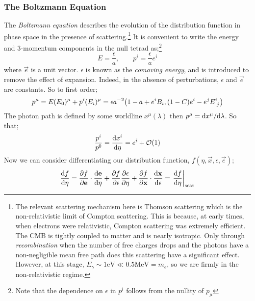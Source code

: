 \subsubsection{The Boltzmann Equation}
The \emph{Boltzmann equation} describes the evolution of the distribution function in phase space in the presence of scattering.\footnote{The relevant scattering mechanism here is Thomson scattering which is the non-relativistic limit of Compton scattering. This is because, at early times, when electrons were relativistic, Compton scattering was extremely efficient. The CMB is tightly coupled to matter and is nearly isotropic. Only through \emph{recombination} when the number of free charges drops and the photons have a non-negligible mean free path does this scattering have a significant effect. However, at this stage, $E_{\gamma} \sim 1 \text{eV} \ll 0.5\text{MeV} = m_e$, so we are firmly in the non-relativistic regime.}
It is convenient to write the energy and $3$-momentum components in the null tetrad as;\footnote{Note that the dependence on $\epsilon$ in $p^i$ follows from the nullity of $p_{\mu}$}
\begin{equation*}
E = \frac{\epsilon}{a}, \qquad p^i = \frac{\epsilon}{a}e^{i}
\end{equation*}
where $\vec e$ is a unit vector. $\epsilon$ is known as the \emph{comoving energy}, and is introduced to remove the effect of expansion. Indeed, in the absence of perturbations, $\epsilon$ and $\vec e$ are constants. So to first order;
\begin{equation}
p^{\mu} = E(E_0)^{\mu} + p^{i}(E_i)^{\mu} = \epsilon a^{-2}\left(1 - a + e^{i}B_i, (1-C)e^{i} - e^{j}E\indices{^{i}_{j}}\right)
\end{equation}
The photon path is defined by some worldline $x^{\mu}(\lambda)$ then $p^{\mu} = \text{d} x^\mu / \text{d} \lambda$. So that;
\begin{equation}
\frac{p^{i}}{p^{0}} = \frac{\text{d} x^i}{\text{d} \eta} = e^{i} + \mathcal{O}(1)
\end{equation}
Now we can consider differentiating our distribution function, $f(\eta, \vec x, \epsilon, \vec e)$;
\begin{equation}
\frac{\ud f}{\ud \eta} = \frac{\del f}{\del \vec e}\cdot\frac{\ud \vec e}{\ud \eta} + \frac{\del f}{\del \epsilon} \frac{\del \epsilon}{\del \eta} + \frac{\del f}{\del \vec x}\cdot\frac{\ud \vec x}{\ud \epsilon} = \left.\frac{\ud f}{\ud \eta}\right|_{\text{scat}}
\end{equation}
